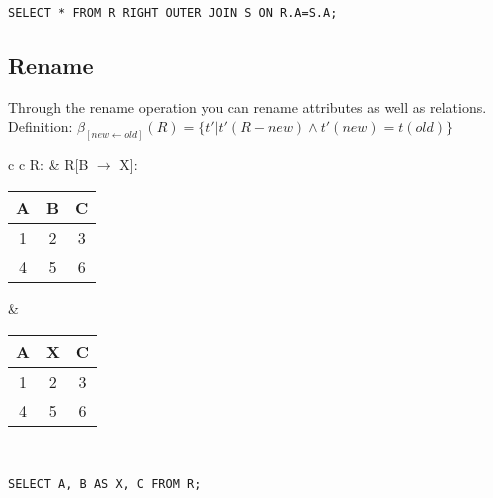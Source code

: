 \lstset{language=SQL,tabsize=4,captionpos=b,frame=single,
basicstyle=\footnotesize}
\begin{lstlisting}[caption=Right-Outer-Join]
SELECT * FROM R RIGHT OUTER JOIN S ON R.A=S.A;
\end{lstlisting}

\subsection{Rename}
Through the rename operation you can rename attributes as well as relations.\\
Definition: $\beta_{[new \leftarrow old]}(R) = \{t' | t' (R - new) \land t'(new)
= t(old)\}$\\

\begin{tabular}{ c c}
	R: & R[B $\rightarrow$ X]:\\
	\begin{tabular}{|c|c|c|}
		\hline
		A & B & C\\
		\hline
		1 & 2 & 3\\
		\hline
		4 & 5 & 6\\
		\hline
	\end{tabular} &

	\begin{tabular}{|c|c|c|}
		\hline
		A & X & C\\
		\hline
		1 & 2 & 3\\
		\hline
		4 & 5 & 6\\
		\hline
	\end{tabular}
\end{tabular}\\

\lstset{language=SQL,tabsize=4,captionpos=b,frame=single,
basicstyle=\footnotesize}
\begin{lstlisting}[caption=Right-Outer-Join]
SELECT A, B AS X, C FROM R;
\end{lstlisting}

